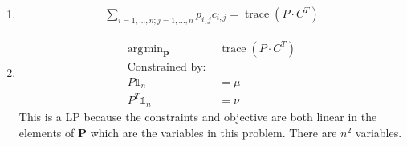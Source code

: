 \documentclass[11pt]{article}
\DeclareMathOperator*{\argmin}{arg\!min}
\DeclareMathOperator*{\trace}{trace}
\begin{document}
\begin{solution}
\begin{enumerate}
\item
    \begin{align*}
    \sum_{i=1,\dots,n ; j=1,\dots,n} p_{i,j} c_{i,j} = \trace(P \cdot C^T)
    \end{align*}

\item
    \begin{align*}
        \argmin_{\mathbf{P}} &\trace(P \cdot C^T) \\
        \text{Constrained by: }& \\
        P \mathbb{1}_n &= \mu \\
        P^T \mathbb{1}_n &= \nu
    \end{align*}
    This is a LP because the constraints and objective are both linear in the elements of $\mathbf{P}$ which are the variables in this problem. There are $n^2$ variables.


\end{enumerate}
\end{solution}
\end{document}
